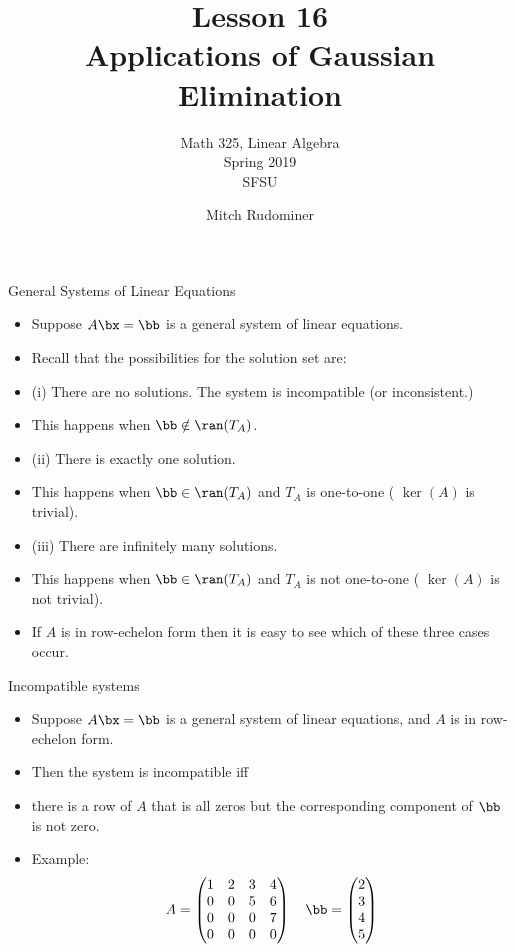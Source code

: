 \documentclass{beamer}
\title{Lesson 16 \\ Applications of Gaussian Elimination}
\subtitle{Math 325, Linear Algebra \\ Spring 2019 \\ SFSU}
\author{Mitch Rudominer}
\date{}
\begin{document}
\begin{frame}
  \titlepage
\end{frame}


\begin{frame}{General Systems of Linear Equations}

\begin{itemize}
\item Suppose $A\bx=\bb$ is a general system of linear equations.
\item Recall that the possibilities for the solution set are:
\item (i) There are no solutions. The system is incompatible (or inconsistent.)
\item This happens when $\bb\notin\ran(T_A)$.
\item (ii) There is exactly one solution.
\item This happens when $\bb\in\ran(T_A)$  and $T_A$ is one-to-one ( $\ker(A)$ is trivial).
\item (iii) There are infinitely many solutions.
\item This happens when $\bb\in\ran(T_A)$  and $T_A$ is not one-to-one ( $\ker(A)$ is not trivial).
\item If $A$ is in row-echelon form then it is easy to see which of these three cases occur.
\end{itemize}
\end{frame}


\begin{frame}{Incompatible systems}

\begin{itemize}
\item Suppose $A\bx=\bb$ is a general system of linear equations, and $A$ is in row-echelon form.
\item Then the system is incompatible iff
\item there is a row of $A$ that is all zeros but the corresponding component of $\bb$ is not zero.
\item Example:
$$
A =
\begin{pmatrix}
1 & 2 & 3 & 4 \\
0 & 0 & 5 & 6 \\
0 & 0 & 0 & 7 \\
0 & 0 & 0 & 0 \\
\end{pmatrix}
\quad
\bb=
\begin{pmatrix}
2 \\ 3 \\ 4 \\ 5
\end{pmatrix}
$$

\end{itemize}
\end{frame}
\end{document}
